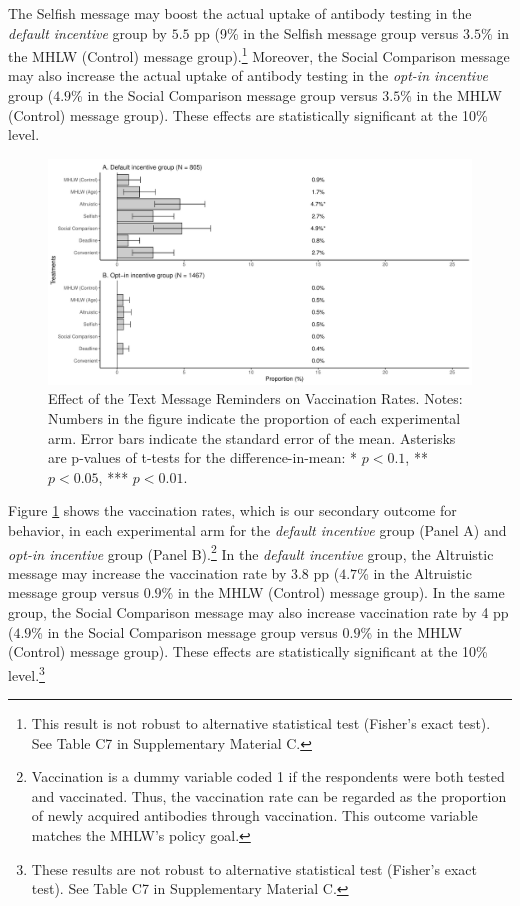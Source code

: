 \documentclass[
      12pt,
    a4paper
]{article}
\begin{document}
The Selfish message may boost the actual uptake of antibody testing in the \emph{default incentive} group by \(5.5\) pp (9\% in the Selfish message group versus \(3.5\)\% in the MHLW (Control) message group).\footnote{This result is not robust to alternative statistical test (Fisher's exact test). See Table C7 in Supplementary Material C.} Moreover, the Social Comparison message may also increase the actual uptake of antibody testing in the \emph{opt-in incentive} group (\(4.9\)\% in the Social Comparison message group versus \(3.5\)\% in the MHLW (Control) message group). These effects are statistically significant at the 10\% level.

\begin{figure}[t]
\includegraphics{Main-Document-LaTeX_files/figure-latex/ttest-act-vacc-1} \caption{Effect of the Text Message Reminders on Vaccination Rates. Notes: Numbers in the figure indicate the proportion of each experimental arm. Error bars indicate the standard error of the mean. Asterisks are p-values of t-tests for the difference-in-mean: * $p < 0.1$, ** $p < 0.05$, *** $p < 0.01$.}\label{fig:ttest-act-vacc}
\end{figure}

Figure \ref{fig:ttest-act-vacc} shows the vaccination rates, which is our secondary outcome for behavior, in each experimental arm for the \emph{default incentive} group (Panel A) and \emph{opt-in incentive} group (Panel B).\footnote{Vaccination is a dummy variable coded 1 if the respondents were both tested and vaccinated. Thus, the vaccination rate can be regarded as the proportion of newly acquired antibodies through vaccination. This outcome variable matches the MHLW's policy goal.} In the \emph{default incentive} group, the Altruistic message may increase the vaccination rate by \(3.8\) pp (\(4.7\)\% in the Altruistic message group versus \(0.9\)\% in the MHLW (Control) message group). In the same group, the Social Comparison message may also increase vaccination rate by 4 pp (\(4.9\)\% in the Social Comparison message group versus \(0.9\)\% in the MHLW (Control) message group). These effects are statistically significant at the 10\% level.\footnote{These results are not robust to alternative statistical test (Fisher's exact test). See Table C7 in Supplementary Material C.}
\end{document}
